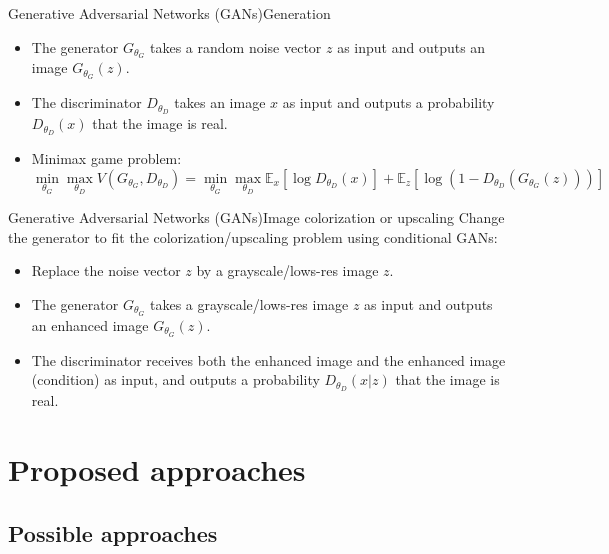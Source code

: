 \documentclass[aspectratio=169]{beamer}
\theoremstyle{definition}
\begin{document}
\begin{frame}{Generative Adversarial Networks (GANs)}{Generation}
    \begin{itemize}
        \item The generator $G_{\theta_G}$ takes a random noise vector $z$ as input and outputs an image $G_{\theta_G}(z)$.
        \item The discriminator $D_{\theta_D}$ takes an image $x$ as input and outputs a probability $D_{\theta_D}(x)$ that the image is real.
        \item Minimax game problem:
        \begin{equation*}
            \min_{\theta_G}\max_{\theta_D} V(G_{\theta_G}, D_{\theta_D}) = \min_{\theta_G}\max_{\theta_D}\mathbb{E}_x[\log D_{\theta_D}(x)] + \mathbb{E}_z[\log(1 - D_{\theta_D}(G_{\theta_G}(z)))]
        \end{equation*}
    \end{itemize}
\end{frame}

\begin{frame}{Generative Adversarial Networks (GANs)}{Image colorization or upscaling}
    Change the generator to fit the colorization/upscaling problem using conditional GANs:
    \begin{itemize}
        \item Replace the noise vector $z$ by a grayscale/lows-res image $z$.
        \item The generator $G_{\theta_G}$ takes a grayscale/lows-res image $z$ as input and outputs an enhanced image $G_{\theta_G}(z)$.
        \item The discriminator receives both the enhanced image and the enhanced image (condition) as input, and outputs a probability $D_{\theta_D}(x|z)$ that the image is real.
    \end{itemize}
\end{frame}

\section{Proposed approaches}
\subsection{Possible approaches}
\end{document}
